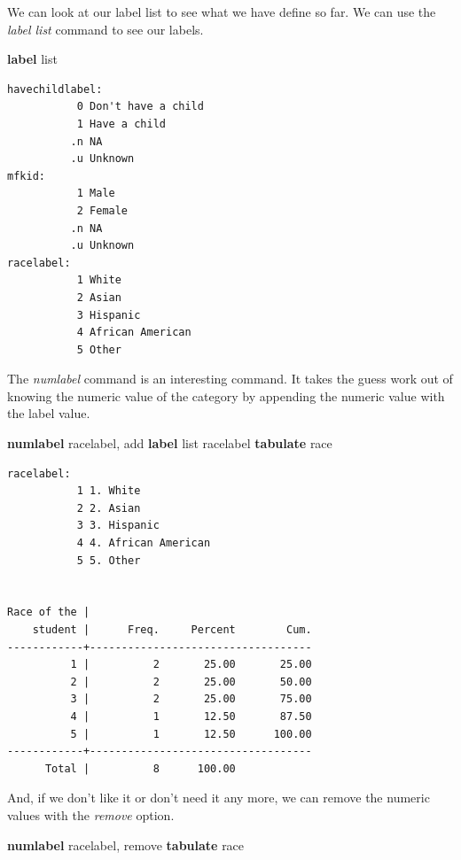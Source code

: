 \documentclass[
]{book}
\newenvironment{Shaded}{\begin{snugshade}}{\end{snugshade}}
\newcommand{\KeywordTok}[1]{\textcolor[rgb]{0.13,0.29,0.53}{\textbf{#1}}}
\newcommand{\NormalTok}[1]{#1}
\newcommand{\OtherTok}[1]{\textcolor[rgb]{0.56,0.35,0.01}{#1}}
\begin{document}
We can look at our label list to see what we have define so far. We can use the \emph{label list} command to see our labels.

\begin{Shaded}
\begin{Highlighting}[]
\KeywordTok{label} \OtherTok{list}
\end{Highlighting}
\end{Shaded}

\begin{verbatim}
havechildlabel:
           0 Don't have a child
           1 Have a child
          .n NA
          .u Unknown
mfkid:
           1 Male
           2 Female
          .n NA
          .u Unknown
racelabel:
           1 White
           2 Asian
           3 Hispanic
           4 African American
           5 Other
\end{verbatim}

The \emph{numlabel} command is an interesting command. It takes the guess work out of knowing the numeric value of the category by appending the numeric value with the label value.

\begin{Shaded}
\begin{Highlighting}[]
\KeywordTok{numlabel}\NormalTok{ racelabel, add}
\KeywordTok{label} \OtherTok{list}\NormalTok{ racelabel}
\KeywordTok{tabulate}\NormalTok{ race}
\end{Highlighting}
\end{Shaded}

\begin{verbatim}
racelabel:
           1 1. White
           2 2. Asian
           3 3. Hispanic
           4 4. African American
           5 5. Other


Race of the |
    student |      Freq.     Percent        Cum.
------------+-----------------------------------
          1 |          2       25.00       25.00
          2 |          2       25.00       50.00
          3 |          2       25.00       75.00
          4 |          1       12.50       87.50
          5 |          1       12.50      100.00
------------+-----------------------------------
      Total |          8      100.00
\end{verbatim}

And, if we don't like it or don't need it any more, we can remove the numeric values with the \emph{remove} option.

\begin{Shaded}
\begin{Highlighting}[]
\KeywordTok{numlabel}\NormalTok{ racelabel, remove}
\KeywordTok{tabulate}\NormalTok{ race}
\end{Highlighting}
\end{Shaded}
\end{document}
